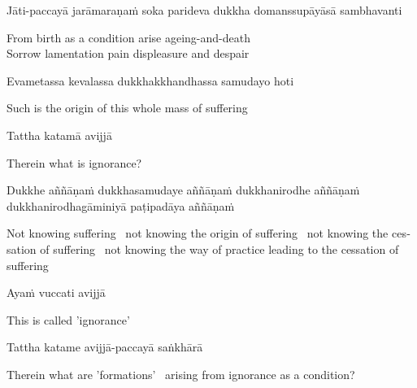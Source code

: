 Jāti-paccayā jarāmaraṇaṁ soka parideva dukkha domanssupāyāsā sambhavanti

\begin{english}
  From birth as a condition arise ageing-and-death\\
  Sorrow lamentation pain displeasure and despair
\end{english}

Evametassa kevalassa dukkhakkhandhassa samudayo hoti

\begin{english}
  Such is the origin of this whole mass of suffering
\end{english}

Tattha katamā avijjā

\begin{english}
  Therein what is ignorance?
\end{english}

Dukkhe aññāṇaṁ dukkhasamudaye aññāṇaṁ dukkhanirodhe aññāṇaṁ dukkhanirodhagāminiyā paṭipadāya aññāṇaṁ

\begin{english}
  Not knowing suffering \breathmark\ not knowing the origin of suffering \breathmark\ not knowing the cessation of suffering \breathmark\ not knowing the way of practice leading to the cessation of suffering
\end{english}

Ayaṁ vuccati avijjā

\begin{english}
  This is called 'ignorance'
\end{english}

Tattha katame avijjā-paccayā saṅkhārā

\begin{english}
  Therein what are 'formations' \breathmark\ arising
  from ignorance as a condition?
\end{english}

